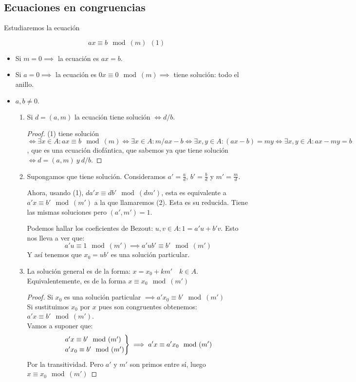 \subsection{Ecuaciones en congruencias}
\begin{nprop}

  Estudiaremos la ecuación

  $$ax \equiv b \mod(m) \  \ (1)$$

\begin{itemize}
	\item Si $m = 0 \implies$ la ecuación es $ax = b$.
	\item Si $a = 0\implies $ la ecuación es $0x \equiv 0 \mod(m) \implies$ tiene solución: todo el anillo.
	\item $a,b \ne 0$.
	\begin{enumerate}

	\item Si $d = (a,m)$ la ecuación tiene solución $\iff  d/b$. \\
        \begin{proof}
	(1) tiene solución $\iff \exists x \in A : ax \equiv b\mod(m) \iff \exists x \in A : m/ax-b \iff \exists x,y \in A : (ax-b) = my \iff \exists x,y \in A: ax -my  = b$, que es una ecuación diofántica, que sabemos ya que tiene solución $\iff d =(a,m) \ y  \ d/b$.
\end{proof}
	\item  Supongamos que tiene solución. Consideramos $a'= \frac{a}{d}$, $b'= \frac{b}{d}$ y $m' = \frac{m}{d}$.

	Ahora, usando (1), $da'x \equiv db'\mod(dm')$, esta es equivalente a $a'x \equiv b' \mod(m')$ a la que llamaremos (2). Esta es su reducida. Tiene las mismas soluciones pero $(a',m') = 1$.

	Podemos hallar los coeficientes de Bezout: $u,v \in A :  1 = a'u + b'v$. Esto nos lleva a ver que:
	\[
	a'u \equiv 1 \mod(m') \implies a'ub' \equiv b' \mod(m')
	\]
	Y así tenemos que $x_0 = ub'$ es una solución particular.

	\item La solución general es de la forma: $x = x_0 +km' \quad k \in A$. Equivalentemente, es de la forma $x \equiv x_0 \mod(m')$\\
	\begin{proof}
	Si $x_0$ es una solución particular $\implies a'x_0 \equiv b'\mod(m')$\\
	Si sustituimos $x_0$ por $x$ pues son congruentes obtenemos: $a'x \equiv b' \mod(m')$.\\
	Vamos a suponer que:
	\[
	\begin{rcases}
	a'x \equiv b' \mod(m')\\
	a' x_0 \equiv b' \mod(m')
\end{rcases} \implies a'x \equiv a'x_0 \mod(m')
	\]
Por la transitividad. Pero $a'$ y $m'$ son primos entre sí, luego $x \equiv x_0 \mod(m')$
\end{proof}


\end{enumerate}
\end{itemize}
\end{nprop}
